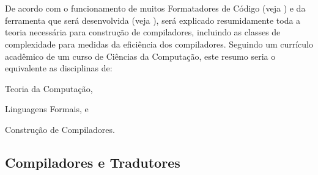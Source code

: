 

\chapter{}
\label{fundamentacaoTeorica}

De acordo com o funcionamento de muitos Formatadores de Código (veja ) e
da ferramenta que será desenvolvida (veja ),
será explicado resumidamente toda a teoria necessária para construção de compiladores,
incluindo as classes de complexidade para medidas da eficiência dos compiladores.
Seguindo um currículo acadêmico de um curso de Ciências da Computação,
este resumo seria o equivalente as disciplinas de:
\begin{inparaenum}[1)]
\item Teoria da Computação,
\item Linguagens Formais, e
\item Construção de Compiladores.
\end{inparaenum}


\section{Compiladores e Tradutores}
\label{compiladoresEtradutores}

